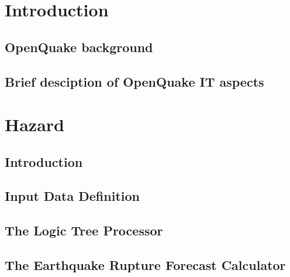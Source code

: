 \documentclass[12pt,a4paper,headings=small,version=first,dvips]{scrbook}
\begin{document}
\part{Introduction}
\chapter{OpenQuake background}
	
\chapter{Brief desciption of OpenQuake IT aspects}
	
\part{Hazard}
\chapter{Introduction}
	
\chapter{Input Data Definition}
	\label{chap:idd}
	
\chapter{The Logic Tree Processor}
	\label{chap:ltp}
	
\chapter{The Earthquake Rupture Forecast Calculator}
	\label{chap:erfc}
		
\end{document}
